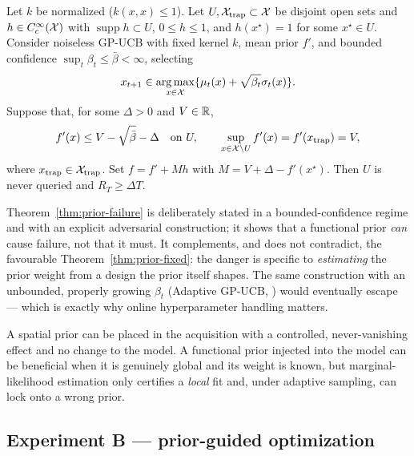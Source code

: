 \begin{theorem}
\label{thm:prior-failure}
Let $k$ be normalized ($k(x,x)\le1$). Let $U,\mathcal{X}_{\mathrm{trap}}\subset\mathcal{X}$
be disjoint open sets and $h\in C_c^\infty(\mathcal{X})$ with
$\operatorname{supp}h\subset U$, $0\le h\le1$, and $h(x^\star)=1$
for some $x^\star\in U$. Consider noiseless GP-UCB with fixed kernel $k$,
mean prior $f'$, and bounded confidence
$\sup_t\beta_t\le\bar\beta<\infty$, selecting
\[
x_{t+1}\in\operatorname*{arg\,max}_{x\in\mathcal{X}}
\{\mu_t(x)+\sqrt{\beta_t}\sigma_t(x)\}.
\]
Suppose that, for some $\Delta>0$ and $V\in\mathbb{R}$,
\[
f'(x)\le V-\sqrt{\bar\beta}-\Delta
\quad\text{on }U,
\qquad
\sup_{x\in\mathcal{X}\setminus U}f'(x)
=f'(x_{\mathrm{trap}})=V,
\]
where $x_{\mathrm{trap}}\in\mathcal{X}_{\mathrm{trap}}$. Set $f=f'+Mh$ with
$M=V+\Delta-f'(x^\star)$. Then $U$ is never queried and
$R_T\ge\Delta T$.
\end{theorem}

\begin{remark}
Theorem~\ref{thm:prior-failure} is deliberately stated in a bounded-confidence
regime and with an explicit adversarial construction; it shows that a functional
prior \emph{can} cause failure, not that it must. It complements, and does not
contradict, the favourable Theorem~\ref{thm:prior-fixed}: the danger is specific
to \emph{estimating} the prior weight from a design the prior itself shapes. The
same construction with an unbounded, properly growing $\beta_t$ (Adaptive GP-UCB,
\cite{berkenkamp2019}) would eventually escape --- which is exactly why online
hyperparameter handling matters.
\end{remark}

\begin{takeaway}
A spatial prior can be placed in the acquisition with a controlled,
never-vanishing effect and no change to the model. A functional prior injected
into the model can be beneficial when it is genuinely global and its weight is
known, but marginal-likelihood estimation only certifies a \emph{local} fit and,
under adaptive sampling, can lock onto a wrong prior.
\end{takeaway}

\subsection{Experiment B --- prior-guided optimization}
\label{sec:contrib-prior-exp}

